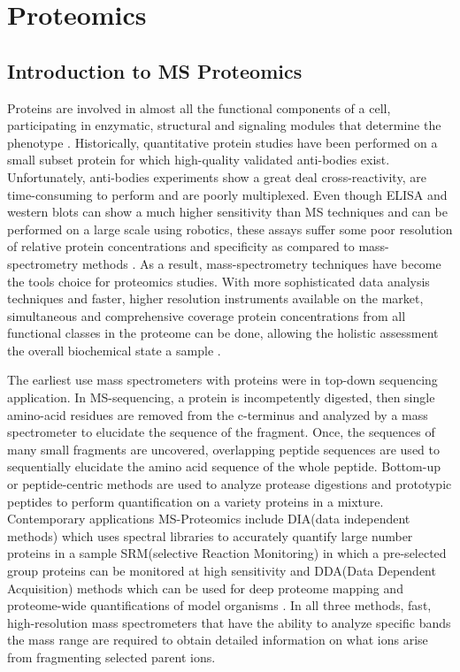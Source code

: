 \documentclass[a4paper,11pt,twoside]{book}
\begin{document}
	
	\chapter{Proteomics}
	
	\section{Introduction to MS Proteomics}
    Proteins are involved in almost all the functional components of a cell, participating in enzymatic, structural and signaling modules that determine the phenotype \citep{Hartwell1999FromBiology}. Historically, quantitative protein studies have been performed on a small subset protein for which high-quality validated anti-bodies exist. Unfortunately, anti-bodies experiments show a great deal cross-reactivity, are time-consuming to perform and are poorly multiplexed\citep{Solier2014Antibody-basedLimitations}. Even though ELISA and western blots can show a much higher sensitivity than MS techniques and can be performed on a large scale using robotics, these assays suffer some poor resolution of relative protein concentrations and specificity as compared to mass-spectrometry methods \citep{Solier2014Antibody-basedLimitations}. As a result, mass-spectrometry techniques have become the tools choice for proteomics studies. With more sophisticated data analysis techniques and faster, higher resolution instruments available on the market, simultaneous and comprehensive coverage protein concentrations from all functional classes in the proteome can be done, allowing the holistic assessment the overall biochemical state a sample \citep{Schubert2017QuantitativeResearch}.
	
    The earliest use mass spectrometers with proteins were in top-down sequencing application. In MS-sequencing, a protein is incompetently digested, then single amino-acid residues are removed from the c-terminus and analyzed by a mass spectrometer to elucidate the sequence of the fragment. Once, the sequences of many small fragments are uncovered, overlapping peptide sequences are used to sequentially elucidate the amino acid sequence of the whole peptide\citep{Steen2004TheSequencing}. Bottom-up or peptide-centric methods are used to analyze protease digestions and prototypic peptides to perform quantification on a variety proteins in a mixture. Contemporary applications MS-Proteomics include DIA(data independent methods) which uses spectral libraries to accurately quantify large number proteins in a sample SRM(selective Reaction Monitoring) in which a pre-selected group proteins can be monitored at high sensitivity\citep{Picotti2012SelectedDirections} and DDA(Data Dependent Acquisition) methods which can be used for deep proteome mapping \citep{Nagaraj2011DeepLine.} and proteome-wide quantifications of model organisms \citep{deGodoy2008ComprehensiveYeast}. In all three methods, fast, high-resolution mass spectrometers that have the ability to analyze specific bands the mass range are required to obtain detailed information on what ions arise from fragmenting selected parent ions.
	
\end{document}
